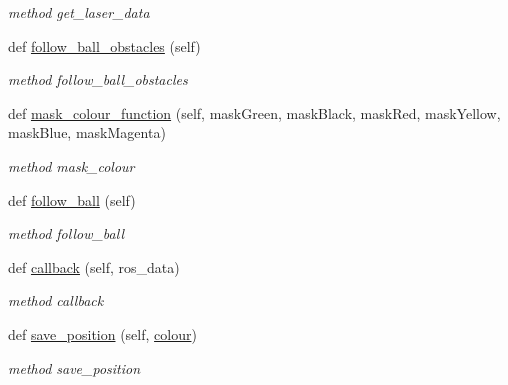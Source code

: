 \begin{DoxyCompactItemize}
\begin{DoxyCompactList}\small\item\em method get\+\_\+laser\+\_\+data \end{DoxyCompactList}\item 
def \hyperlink{classopencv__tracking_1_1track__ball_a6a844f8b5d121f37938d9e5c4d1ad44c}{follow\+\_\+ball\+\_\+obstacles} (self)
\begin{DoxyCompactList}\small\item\em method follow\+\_\+ball\+\_\+obstacles \end{DoxyCompactList}\item 
def \hyperlink{classopencv__tracking_1_1track__ball_ac95fc1ff294fdebb621e91067ac3648e}{mask\+\_\+colour\+\_\+function} (self, mask\+Green, mask\+Black, mask\+Red, mask\+Yellow, mask\+Blue, mask\+Magenta)
\begin{DoxyCompactList}\small\item\em method mask\+\_\+colour \end{DoxyCompactList}\item 
def \hyperlink{classopencv__tracking_1_1track__ball_a97b88b8814e8df768a2a80c9e50b73d0}{follow\+\_\+ball} (self)
\begin{DoxyCompactList}\small\item\em method follow\+\_\+ball \end{DoxyCompactList}\item 
def \hyperlink{classopencv__tracking_1_1track__ball_ad0eefbf72841665b36372a1487f54960}{callback} (self, ros\+\_\+data)
\begin{DoxyCompactList}\small\item\em method callback \end{DoxyCompactList}\item 
def \hyperlink{classopencv__tracking_1_1track__ball_ae0d619c1482ceae4077eb958e86cb355}{save\+\_\+position} (self, \hyperlink{classopencv__tracking_1_1track__ball_ad8c66a1a437111152cf8f5797254c0d1}{colour})
\begin{DoxyCompactList}\small\item\em method save\+\_\+position \end{DoxyCompactList}\end{DoxyCompactItemize}
